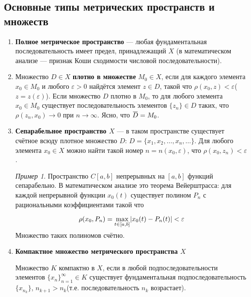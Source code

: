 \documentclass[12pt,a4paper,titlepage,oneside]{book}
\newcommand{\overbar}[1]{\mkern 1.5mu\overline{\mkern-1.5mu#1\mkern-1.5mu}\mkern 1.5mu}
\theoremstyle{definition}
\theoremstyle{plain}
\theoremstyle{remark}
\theoremstyle{remark}
\newtheorem*{example}{Пример}
\theoremstyle{remark}
\theoremstyle{remark}
\theoremstyle{plain}
\theoremstyle{plain}
\begin{document}
\subsection*{Основные типы метрических пространств и множеств}

\begin{enumerate}

	\item \textbf{Полное метрическое пространство} --- любая фундаментальная последовательность имеет предел, принадлежащий $X$ (в математическом анализе --- признак Коши сходимости числовой последовательности).

	\item Множество $D \in X$ \textbf{плотно в множестве} $ M_0 \in X$, если для каждого элемента $x_0 \in M_0$ и любого $\varepsilon > 0$ найдётся элемент $z \in D$, такой что $\rho(x_0, z) < \varepsilon$($z = z(\varepsilon)$). Если множество $D$ плотно в $M_0$, то для любого элемента $x_0 \in  M_0$ существует последовательность элементов $\lbrace z_n \rbrace \in D$ таких, что $\rho(z_n, x_0) \to 0$ при $n \to \infty$. Ясно, что $\overbar{D} = M_0$.

	\item \textbf{Сепарабельное пространство $X$} --- в таком пространстве существует счётное всюду плотное множество $D$: $D=\lbrace x_1,x_2,\ldots,x_n,\ldots \rbrace$. Для любого элемента $x_0 \in X$ можно найти такой номер $n = n(x_0,\varepsilon)$, что $\rho(x_0, z_n) < \varepsilon$.

	\begin{example}	
	Пространство $C[a,b]$ непрерывных на $[a,b]$ функций сепарабельно. В математическом анализе это теорема Вейерштрасса: для каждой непрерывной функции $x_0(t)$ существует полином $P_n$ с рациональными коэффициентами такой что
	
	\begin{equation*}
	\rho(x_0, P_n)=\smash{\displaystyle\max_{t \in [a,b]}} |x_0(t)-P_n(t)| < \varepsilon
	\end{equation*}

	Множество таких полиномов счётно.
	\end{example}

	\item \textbf{Компактное множество метрического пространства $X$}

	Множество $K$ компактно в $X$, если в любой подпоследовательности элементов $\lbrace x_n \rbrace_{n=1}^{\infty} \in K$ существует фундаментальная подпоследовательность $\lbrace x_{n_k} \rbrace$, $n_{k+1}>n_k$(т.е. последовательность $n_k$ возрастает).

\end{enumerate}
\end{document}
